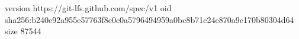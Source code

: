 version https://git-lfs.github.com/spec/v1
oid sha256:b240e92a955e57763f8e0c0a5796494959a0bc8b71c24e870a9c170b80304d64
size 87544
